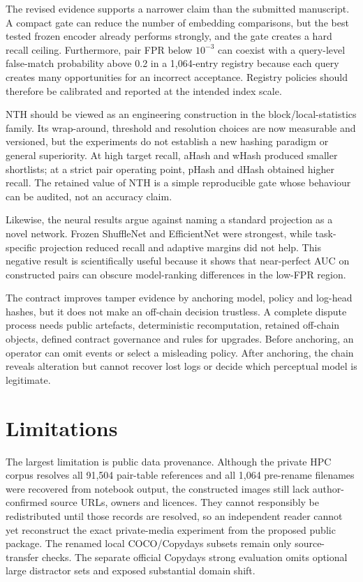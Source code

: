 \documentclass[12pt]{article}
\begin{document}
The revised evidence supports a narrower claim than the submitted manuscript. A compact gate can reduce the number of embedding comparisons, but the best tested frozen encoder already performs strongly, and the gate creates a hard recall ceiling. Furthermore, pair FPR below $10^{-3}$ can coexist with a query-level false-match probability above 0.2 in a 1,064-entry registry because each query creates many opportunities for an incorrect acceptance. Registry policies should therefore be calibrated and reported at the intended index scale.

NTH should be viewed as an engineering construction in the block/local-statistics family. Its wrap-around, threshold and resolution choices are now measurable and versioned, but the experiments do not establish a new hashing paradigm or general superiority. At high target recall, aHash and wHash produced smaller shortlists; at a strict pair operating point, pHash and dHash obtained higher recall. The retained value of NTH is a simple reproducible gate whose behaviour can be audited, not an accuracy claim.

Likewise, the neural results argue against naming a standard projection as a novel network. Frozen ShuffleNet and EfficientNet were strongest, while task-specific projection reduced recall and adaptive margins did not help. This negative result is scientifically useful because it shows that near-perfect AUC on constructed pairs can obscure model-ranking differences in the low-FPR region.

The contract improves tamper evidence by anchoring model, policy and log-head hashes, but it does not make an off-chain decision trustless. A complete dispute process needs public artefacts, deterministic recomputation, retained off-chain objects, defined contract governance and rules for upgrades. Before anchoring, an operator can omit events or select a misleading policy. After anchoring, the chain reveals alteration but cannot recover lost logs or decide which perceptual model is legitimate.

\section{Limitations}

The largest limitation is public data provenance. Although the private HPC corpus resolves all 91,504 pair-table references and all 1,064 pre-rename filenames were recovered from notebook output, the constructed images still lack author-confirmed source URLs, owners and licences. They cannot responsibly be redistributed until those records are resolved, so an independent reader cannot yet reconstruct the exact private-media experiment from the proposed public package. The renamed local COCO/Copydays subsets remain only source-transfer checks. The separate official Copydays strong evaluation omits optional large distractor sets and exposed substantial domain shift.
\end{document}
